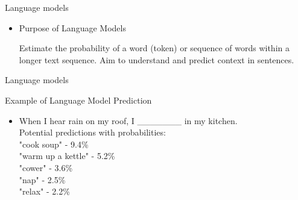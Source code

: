 \documentclass[serif, aspectratio=169]{beamer}
\begin{document}
\begin{frame}{Language models}
    \begin{itemize}
        \item  
            \large{Purpose of Language Models}
            \vspace{0.5cm}
            \begin{outline}
                \1 Estimate the probability of a word (token) or sequence of words within a longer text sequence.
                \vspace{0.2cm}
                \1 Aim to understand and predict context in sentences.
            \end{outline}
            \vspace{0.3cm}
        
    \end{itemize}
\end{frame}
    
\begin{frame}{Language models}
    \begin{exampleblock}{Example of Language Model Prediction}
        \begin{itemize}
            \item 
                When I hear rain on my roof, I \_\_\_\_\_\_\_ in my kitchen.\\
                Potential predictions with probabilities:\\
                \hspace{1cm}"cook soup" - 9.4\%\\
                \hspace{1cm}"warm up a kettle" - 5.2\%\\
                \hspace{1cm}"cower" - 3.6\%\\
                \hspace{1cm}"nap" - 2.5\%\\
                \hspace{1cm}"relax" - 2.2\%\\
        \end{itemize}
    \end{exampleblock}
\end{frame}
\end{document}
